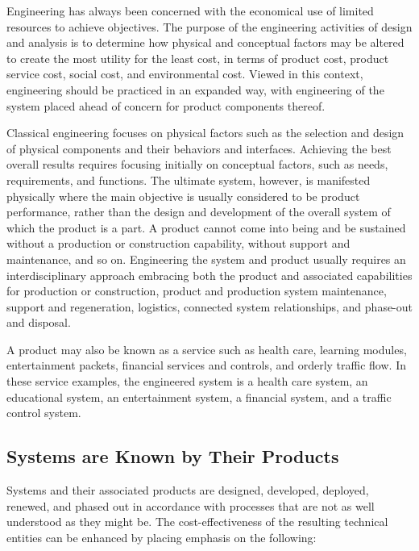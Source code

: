 Engineering has always been concerned with the economical use of limited resources to achieve objectives. The purpose of the engineering activities of design and analysis is to determine how physical and conceptual factors may be altered to create the most utility for the least cost, in terms of product cost, product service cost, social cost, and environmental cost. Viewed in this context, engineering should be practiced in an expanded way, with engineering of the system placed ahead of concern for product components thereof.

Classical engineering focuses on physical factors such as the selection and design of physical components and their behaviors and interfaces. Achieving the best overall results requires focusing initially on conceptual factors, such as needs, requirements, and functions. The ultimate system, however, is manifested physically where the main objective is usually considered to be product performance, rather than the design and development of the overall system of which the product is a part. A product cannot come into being and be sustained without a production or construction capability, without support and maintenance, and so on. Engineering the system and product usually requires an interdisciplinary approach embracing both the product and associated capabilities for production or construction, product and production system maintenance, support and regeneration, logistics, connected system relationships, and phase-out and disposal.

A product may also be known as a service such as health care, learning modules, entertainment packets, financial services and controls, and orderly traffic flow. In these service examples, the engineered system is a health care system, an educational system, an entertainment system, a financial system, and a traffic control system.

\subsection{Systems are Known by Their Products}

Systems and their associated products are designed, developed, deployed, renewed, and phased out in accordance with processes that are not as well understood as they might be. The cost-effectiveness of the resulting technical entities can be enhanced by placing emphasis on the following:

